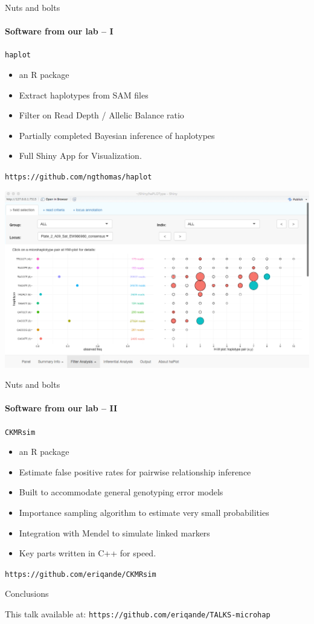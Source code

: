 \documentclass[letter,graphicx]{beamer}
\begin{document}
\begin{frame}{Nuts and bolts}
\framesubtitle{Software from our lab -- I}

{\tt\Large haplot}
\begin{itemize}
\item an R package
\item Extract haplotypes from SAM files
\item Filter on Read Depth / Allelic Balance ratio
\item Partially completed Bayesian inference of haplotypes
\item Full Shiny App for Visualization.
\end{itemize}

{\tt https://github.com/ngthomas/haplot}
\end{frame}


\newpage
\mbox{}
\vspace*{2em}
\mbox{}
\includegraphics[width=\textwidth]{mhap_figs/haplot2.png}



\begin{frame}{Nuts and bolts}
\framesubtitle{Software from our lab -- II}

{\tt\Large CKMRsim}
\begin{itemize}
\item an R package
\item Estimate false positive rates for pairwise relationship inference
\item Built to accommodate general genotyping error models
\item Importance sampling algorithm to estimate very small probabilities
\item Integration with Mendel to simulate linked markers
\item Key parts written in C++ for speed.
\end{itemize}

{\tt https://github.com/eriqande/CKMRsim}
\end{frame}



\begin{frame}{Conclusions}


This talk available at:
{\tt https://github.com/eriqande/TALKS-microhap}
\end{frame}
\end{document}
